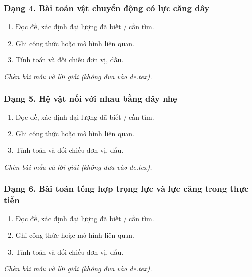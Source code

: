 \subsubsection{Dạng 4. Bài toán vật chuyển động có lực căng dây}
\begin{phuongphap}
\begin{enumerate}
\item Đọc đề, xác định đại lượng đã biết / cần tìm.
\item Ghi công thức hoặc mô hình liên quan.
\item Tính toán và đối chiếu đơn vị, dấu.
\end{enumerate}
\end{phuongphap}
\begin{vidumau}
\textit{Chèn bài mẫu và lời giải (không đưa vào de.tex).}
\end{vidumau}

\subsubsection{Dạng 5. Hệ vật nối với nhau bằng dây nhẹ}
\begin{phuongphap}
\begin{enumerate}
\item Đọc đề, xác định đại lượng đã biết / cần tìm.
\item Ghi công thức hoặc mô hình liên quan.
\item Tính toán và đối chiếu đơn vị, dấu.
\end{enumerate}
\end{phuongphap}
\begin{vidumau}
\textit{Chèn bài mẫu và lời giải (không đưa vào de.tex).}
\end{vidumau}

\subsubsection{Dạng 6. Bài toán tổng hợp trọng lực và lực căng trong thực tiễn}
\begin{phuongphap}
\begin{enumerate}
\item Đọc đề, xác định đại lượng đã biết / cần tìm.
\item Ghi công thức hoặc mô hình liên quan.
\item Tính toán và đối chiếu đơn vị, dấu.
\end{enumerate}
\end{phuongphap}
\begin{vidumau}
\textit{Chèn bài mẫu và lời giải (không đưa vào de.tex).}
\end{vidumau}

